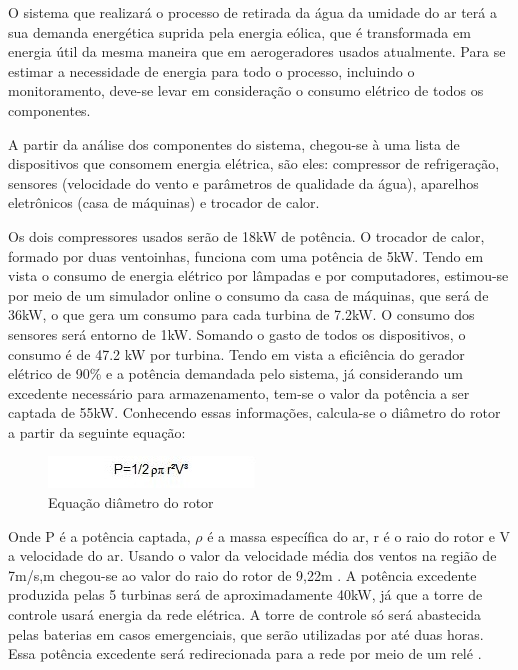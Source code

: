 O sistema que realizará o processo de retirada da água da umidade do ar terá a sua demanda energética suprida pela energia eólica, que é transformada em energia útil da mesma maneira que em aerogeradores usados atualmente. Para se estimar a necessidade de energia para todo o processo, incluindo o monitoramento, deve-se levar em consideração o consumo elétrico de todos os componentes.

A partir da análise dos componentes do sistema, chegou-se à uma lista de dispositivos que consomem energia elétrica, são eles: compressor de refrigeração, sensores (velocidade do vento e parâmetros de qualidade da água), aparelhos eletrônicos (casa de máquinas) e trocador de calor.

Os dois compressores usados serão de 18kW de potência. O trocador de calor, formado por duas ventoinhas, funciona com uma potência de 5kW. Tendo em vista o consumo de energia elétrico por lâmpadas e por computadores, estimou-se por meio de um simulador online o consumo da casa de máquinas, que será de 36kW, o que gera um consumo para cada turbina de 7.2kW. O consumo dos sensores será entorno de 1kW. Somando o gasto de todos os dispositivos, o consumo é de 47.2 kW por turbina.
Tendo em vista a eficiência do gerador elétrico de 90\% e a potência demandada pelo sistema, já considerando um excedente necessário para armazenamento, tem-se o valor da potência a ser captada de 55kW. Conhecendo essas informações, calcula-se o diâmetro do rotor a partir da seguinte equação:

\FloatBarrier
\begin{figure}[!ht]
\centering
\includegraphics[scale=1]{figuras/eq_1energia}
\caption[Equação Rotor]{Equação diâmetro do rotor}
\label{rotor}
\end{figure}
\FloatBarrier

Onde P é a potência captada, $\rho$ é a massa específica do ar, r é o raio do rotor e V a velocidade do ar. Usando o valor da velocidade média dos ventos na região de 7m/s,m chegou-se ao valor do raio do rotor de 9,22m \cite{layton2011}.
A potência excedente produzida pelas 5 turbinas será de aproximadamente 40kW, já que a torre de controle usará energia da rede elétrica. A torre de controle só será abastecida pelas baterias em casos emergenciais, que serão utilizadas por até duas horas. Essa potência excedente será redirecionada para a rede por meio de um relé \cite{aldabo2002}.
